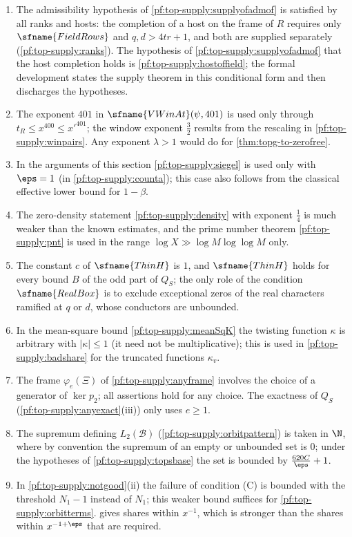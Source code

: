 \begin{remark}\label{pf:top-supply:remarks}
\begin{enumerate}[label=(\arabic*),leftmargin=*]
\item The admissibility hypothesis of \cref{pf:top-supply:supplyofadmof} is satisfied by all ranks and hosts: the completion
of a host on the frame of $R$ requires only $\sfname{FieldRows}$ and $q,d>4tr+1$, and both are supplied separately
(\cref{pf:top-supply:ranks}). The hypothesis of \cref{pf:top-supply:supplyofadmof} that the host completion holds is
\cref{pf:top-supply:hostoffield}; the formal development states the supply theorem in this conditional form and then
discharges the hypotheses.
\item The exponent $401$ in $\sfname{VWinAt}(\psi,401)$ is used only through $t_R\le x^{400}\le x'^{401}$; the window exponent
$\frac32$ results from the rescaling in \cref{pf:top-supply:winpairs}. Any exponent $\lambda>1$ would do for
\cref{thm:topg-to-zerofree}.
\item In the arguments of this section \cref{pf:top-supply:siegel} is used only with $\eps=1$ (in
\cref{pf:top-supply:counta}); this case also follows from the classical effective lower bound for $1-\beta$.
\item The zero-density statement \cref{pf:top-supply:density} with exponent $\frac14$ is much weaker than the known
estimates, and the prime number theorem \cref{pf:top-supply:pnt} is used in the range $\log X\gg\log M\log\log M$ only.
\item The constant $c$ of $\sfname{ThinH}$ is $1$, and $\sfname{ThinH}$ holds for every bound $B$ of the odd part of $Q_S$;
the only role of the condition $\sfname{RealBox}$ is to exclude exceptional zeros of the real characters ramified at $q$ or
$d$, whose conductors are unbounded.
\item In the mean-square bound \cref{pf:top-supply:meanSqK} the twisting function $\kappa$ is arbitrary with $|\kappa|\le1$
(it need not be multiplicative); this is used in \cref{pf:top-supply:badshare} for the truncated functions $\kappa_v$.
\item The frame $\varphi_e(\Xi)$ of \cref{pf:top-supply:anyframe} involves the choice of a generator of $\ker p_2$; all
assertions hold for any choice. The exactness of $Q_S$ (\cref{pf:top-supply:anyexact}(iii)) only uses $e\ge1$.
\item The supremum defining $L_2(\mathcal B)$ (\cref{pf:top-supply:orbitpattern}) is taken in $\N$, where by convention the
supremum of an empty or unbounded set is $0$; under the hypotheses of \cref{pf:top-supply:topsbase} the set is bounded by
$\frac{620C}\eps+1$.
\item In \cref{pf:top-supply:notgood}(ii) the failure of condition (C) is bounded with the threshold $N_1-1$ instead of
$N_1$; this weaker bound suffices for \cref{pf:top-supply:orbitterms}.  gives shares within
$x^{-1}$, which is stronger than the shares within $x^{-1+\eps}$ that are required.
\end{enumerate}
\end{remark}



